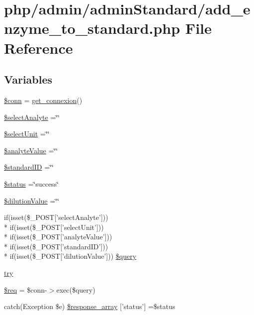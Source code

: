 \hypertarget{add__enzyme__to__standard_8php}{\section{php/admin/admin\-Standard/add\-\_\-enzyme\-\_\-to\-\_\-standard.php File Reference}
\label{add__enzyme__to__standard_8php}
}
\subsection*{Variables}
\begin{DoxyCompactItemize}
\item 
\hyperlink{add__enzyme__to__standard_8php_aa8a5a87b9c1a6a0819b88447cbe41877}{\$conn} = \hyperlink{php__functions_8php_ace18bc10f3fd08f92688ac743e0d8c2e}{get\-\_\-connexion}()
\item 
\hyperlink{add__enzyme__to__standard_8php_ae5b99d173d7360be6556675a80036269}{\$select\-Analyte} =\char`\"{}\char`\"{}
\item 
\hyperlink{add__enzyme__to__standard_8php_a427fdcd2d971a5567fb4d111d8de5f54}{\$select\-Unit} =\char`\"{}\char`\"{}
\item 
\hyperlink{add__enzyme__to__standard_8php_aa0668b8f5734a61bcc5107303a90615a}{\$analyte\-Value} =\char`\"{}\char`\"{}
\item 
\hyperlink{add__enzyme__to__standard_8php_a0c541a369e4a0434108a7d145751bb23}{\$standard\-I\-D} =\char`\"{}\char`\"{}
\item 
\hyperlink{add__enzyme__to__standard_8php_a58391ea75f2d29d5d708d7050b641c33}{\$status} =\char`\"{}success\char`\"{}
\item 
\hyperlink{add__enzyme__to__standard_8php_ad5cb2bd1aacca5b8729d0dc753091153}{\$dilution\-Value} =\char`\"{}\char`\"{}
\item 
if(isset(\$\-\_\-\-P\-O\-S\-T\mbox{[}'select\-Analyte'\mbox{]})) \\*
if(isset(\$\-\_\-\-P\-O\-S\-T\mbox{[}'select\-Unit'\mbox{]})) \\*
if(isset(\$\-\_\-\-P\-O\-S\-T\mbox{[}'analyte\-Value'\mbox{]})) \\*
if(isset(\$\-\_\-\-P\-O\-S\-T\mbox{[}'standard\-I\-D'\mbox{]})) \\*
if(isset(\$\-\_\-\-P\-O\-S\-T\mbox{[}'dilution\-Value'\mbox{]})) \hyperlink{add__enzyme__to__standard_8php_aa89f0556a6e4bd014d777d24dfe180a0}{\$query}
\item 
\hyperlink{add__enzyme__to__standard_8php_abe4cc9788f52e49485473dc699537388}{try}
\item 
\hyperlink{add__enzyme__to__standard_8php_a63a7a283ea5dee8af1e2d5a3435bf370}{\$req} = \$conn-\/$>$exec(\$query)
\item 
catch(Exception \$e) \hyperlink{add__enzyme__to__standard_8php_a8452fb8131316637a04e25f5fde066d9}{\$response\-\_\-array} \mbox{[}'status'\mbox{]} =\$status
\end{DoxyCompactItemize}


